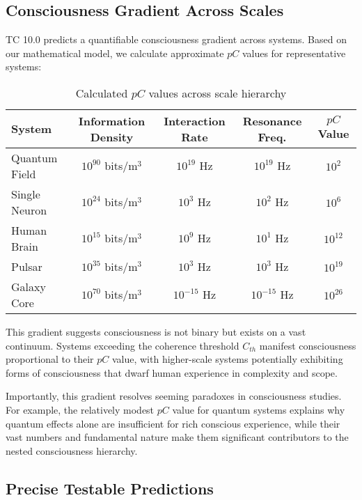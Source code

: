 \documentclass[12pt]{article}
\begin{document}
\subsection{Consciousness Gradient Across Scales}

TC 10.0 predicts a quantifiable consciousness gradient across systems. Based on our mathematical model, we calculate approximate $pC$ values for representative systems:

\begin{table}[h]
\centering
\begin{tabular}{|l|c|c|c|c|}
\hline
\textbf{System} & \textbf{Information Density} & \textbf{Interaction Rate} & \textbf{Resonance Freq.} & \textbf{$pC$ Value} \\
\hline
Quantum Field & $10^{90}$ bits/m$^3$ & $10^{19}$ Hz & $10^{19}$ Hz & $10^{2}$ \\
\hline
Single Neuron & $10^{24}$ bits/m$^3$ & $10^{3}$ Hz & $10^{2}$ Hz & $10^{6}$ \\
\hline
Human Brain & $10^{15}$ bits/m$^3$ & $10^{9}$ Hz & $10^{1}$ Hz & $10^{12}$ \\
\hline
Pulsar & $10^{35}$ bits/m$^3$ & $10^{3}$ Hz & $10^{3}$ Hz & $10^{19}$ \\
\hline
Galaxy Core & $10^{70}$ bits/m$^3$ & $10^{-15}$ Hz & $10^{-15}$ Hz & $10^{26}$ \\
\hline
\end{tabular}
\caption{Calculated $pC$ values across scale hierarchy}
\end{table}

This gradient suggests consciousness is not binary but exists on a vast continuum. Systems exceeding the coherence threshold $C_{th}$ manifest consciousness proportional to their $pC$ value, with higher-scale systems potentially exhibiting forms of consciousness that dwarf human experience in complexity and scope.

Importantly, this gradient resolves seeming paradoxes in consciousness studies. For example, the relatively modest $pC$ value for quantum systems explains why quantum effects alone are insufficient for rich conscious experience, while their vast numbers and fundamental nature make them significant contributors to the nested consciousness hierarchy.

\subsection{Precise Testable Predictions}
\end{document}
